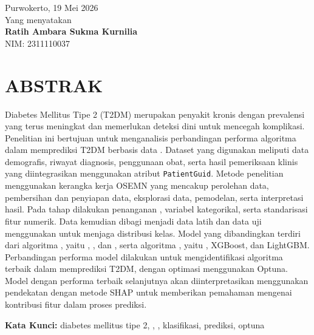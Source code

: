 \vspace{2cm}
\begin{flushright}
Purwokerto, 19 Mei 2026\\
Yang menyatakan\\[2.2cm]
\textbf{Ratih Ambara Sukma Kurnilia}\\
NIM: 2311110037
\end{flushright}

\clearpage
\chapter*{ABSTRAK}
Diabetes Mellitus Tipe 2 (T2DM) merupakan penyakit kronis dengan prevalensi yang terus meningkat dan memerlukan deteksi dini untuk mencegah komplikasi. Penelitian ini bertujuan untuk menganalisis perbandingan performa algoritma  dalam memprediksi T2DM berbasis data . Dataset yang digunakan meliputi data demografis, riwayat diagnosis, penggunaan obat, serta hasil pemeriksaan klinis yang diintegrasikan menggunakan atribut \texttt{PatientGuid}. Metode penelitian menggunakan kerangka kerja OSEMN yang mencakup perolehan data, pembersihan dan penyiapan data, eksplorasi data, pemodelan, serta interpretasi hasil. Pada tahap  dilakukan penanganan ,  variabel kategorikal, serta standarisasi fitur numerik. Data kemudian dibagi menjadi data latih dan data uji menggunakan  untuk menjaga distribusi kelas. Model yang dibandingkan terdiri dari algoritma , yaitu , , dan , serta algoritma , yaitu , XGBoost, dan LightGBM. Perbandingan performa model dilakukan untuk mengidentifikasi algoritma terbaik dalam memprediksi T2DM, dengan optimasi  menggunakan Optuna. Model dengan performa terbaik selanjutnya akan diinterpretasikan menggunakan pendekatan  dengan metode SHAP untuk memberikan pemahaman mengenai kontribusi fitur dalam proses prediksi.

\noindent\textbf{Kata Kunci:} diabetes mellitus tipe 2, , , klasifikasi, prediksi, optuna

\clearpage
